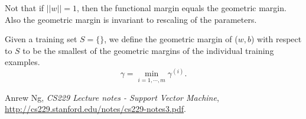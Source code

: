 \documentclass{article}  %
\begin{document}
Not that if $||w||=1$, then the functional margin equals the geometric margin. Also the geometric margin is invariant to rescaling of the parameters.  

Given a training set $S = \{ \}$, we define the geometric margin of ($w,b$) with respect to $S$ to be the smallest of the geometric margins of the individual training examples. 
\[
\gamma = \min_{i=1,\cdots, m}\gamma ^{(i)}.
\]


\begin{thebibliography}{9}

 Anrew Ng, \emph{CS229 Lecture notes - Support Vector Machine}, \url{http://cs229.stanford.edu/notes/cs229-notes3.pdf}.

\end{thebibliography}
\end{document}
